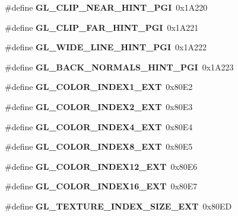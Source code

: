 \begin{DoxyCompactItemize}
\item 
\#define {\bfseries G\+L\+\_\+\+C\+L\+I\+P\+\_\+\+N\+E\+A\+R\+\_\+\+H\+I\+N\+T\+\_\+\+P\+G\+I}~0x1\+A220\label{_s_d_l__opengl_8h_a76fcdd2112193113835419ef9e00c5aa}

\item 
\#define {\bfseries G\+L\+\_\+\+C\+L\+I\+P\+\_\+\+F\+A\+R\+\_\+\+H\+I\+N\+T\+\_\+\+P\+G\+I}~0x1\+A221\label{_s_d_l__opengl_8h_ad2bc33507c7fd107375361565521196b}

\item 
\#define {\bfseries G\+L\+\_\+\+W\+I\+D\+E\+\_\+\+L\+I\+N\+E\+\_\+\+H\+I\+N\+T\+\_\+\+P\+G\+I}~0x1\+A222\label{_s_d_l__opengl_8h_a91e48582a3c3d587b9904e1b44b37afd}

\item 
\#define {\bfseries G\+L\+\_\+\+B\+A\+C\+K\+\_\+\+N\+O\+R\+M\+A\+L\+S\+\_\+\+H\+I\+N\+T\+\_\+\+P\+G\+I}~0x1\+A223\label{_s_d_l__opengl_8h_a416ff27f4b8f56021e43bbc2f07d0fb3}

\item 
\#define {\bfseries G\+L\+\_\+\+C\+O\+L\+O\+R\+\_\+\+I\+N\+D\+E\+X1\+\_\+\+E\+X\+T}~0x80\+E2\label{_s_d_l__opengl_8h_a543a2054de613839eae3518ae474fbe4}

\item 
\#define {\bfseries G\+L\+\_\+\+C\+O\+L\+O\+R\+\_\+\+I\+N\+D\+E\+X2\+\_\+\+E\+X\+T}~0x80\+E3\label{_s_d_l__opengl_8h_aa2227a85a34c9ffbb44bec566c5ff65e}

\item 
\#define {\bfseries G\+L\+\_\+\+C\+O\+L\+O\+R\+\_\+\+I\+N\+D\+E\+X4\+\_\+\+E\+X\+T}~0x80\+E4\label{_s_d_l__opengl_8h_a3e066ff71c6537f79910469d46d8c1ad}

\item 
\#define {\bfseries G\+L\+\_\+\+C\+O\+L\+O\+R\+\_\+\+I\+N\+D\+E\+X8\+\_\+\+E\+X\+T}~0x80\+E5\label{_s_d_l__opengl_8h_a415d3122c4e51790002876126a307c78}

\item 
\#define {\bfseries G\+L\+\_\+\+C\+O\+L\+O\+R\+\_\+\+I\+N\+D\+E\+X12\+\_\+\+E\+X\+T}~0x80\+E6\label{_s_d_l__opengl_8h_a0925dc8b933713a94efcff87cd39bba8}

\item 
\#define {\bfseries G\+L\+\_\+\+C\+O\+L\+O\+R\+\_\+\+I\+N\+D\+E\+X16\+\_\+\+E\+X\+T}~0x80\+E7\label{_s_d_l__opengl_8h_ac0599b7d1f9b099b212a08eae6ae23f3}

\item 
\#define {\bfseries G\+L\+\_\+\+T\+E\+X\+T\+U\+R\+E\+\_\+\+I\+N\+D\+E\+X\+\_\+\+S\+I\+Z\+E\+\_\+\+E\+X\+T}~0x80\+E\+D\label{_s_d_l__opengl_8h_ad91656131e579ff320f55be18359f3a2}


\end{DoxyCompactItemize}
